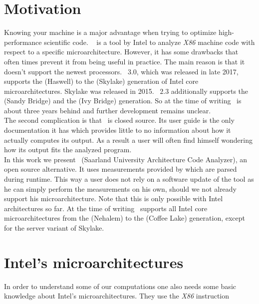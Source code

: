 
\section{Motivation}

Knowing your machine is a major advantage when trying to optimize high-performance scientific code. \iaca\ \cite{iaca} is a tool by Intel to analyze \emph{X86} machine code with respect to a specific microarchitecture. However, it has some drawbacks that often times prevent it from being useful in practice. The main reason is that it doesn't support the newest processors. \iaca\ $3.0$, which was released in late 2017, supports the  (Haswell) to the  (Skylake) generation of Intel core microarchitectures. Skylake was released in 2015. \iaca\ $2.3$ additionally supports the  (Sandy Bridge) and the  (Ivy Bridge) generation. So at the time of writing \iaca\ is about three years behind and further development remains unclear.\\
The second complication is that \iaca\ is closed source. Its user guide \cite{userguide} is the only documentation it has which provides little to no information about how it actually computes its output. As a result a user will often find himself wondering how its output fits the analyzed program.\\
In this work we present \suaca\ (Saarland University Architecture Code Analyzer), an open source alternative. It uses measurements provided by \cite{Andreas} which are parsed during runtime. This way a user does not rely on a software update of the tool as he can simply perform the measurements on his own, should we not already support his microarchitecture. Note that this is only possible with Intel architectures so far. At the time of writing \suaca\ supports all Intel core microarchitectures from the  (Nehalem) to the  (Coffee Lake) generation, except for the server variant of Skylake.
\newpage

\section{Intel's microarchitectures}



In order to understand some of our computations one also needs some basic knowledge about Intel's microarchitectures. They use the \emph{X86} instruction


